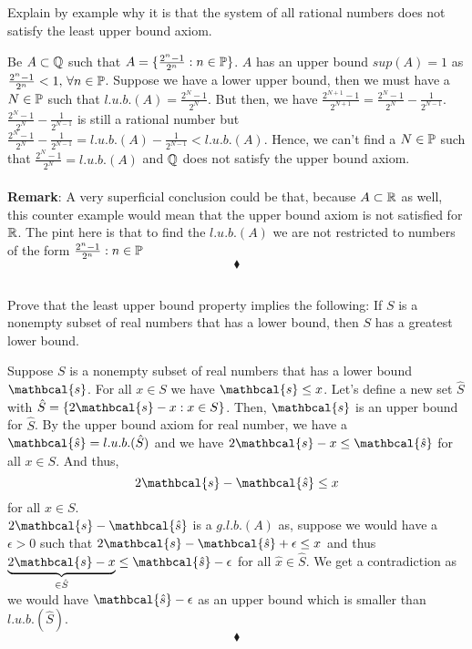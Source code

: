 \subsection{}
\begin{tcolorbox}
Explain by example why it is that the system of all rational numbers does not satisfy the least upper bound axiom.
\end{tcolorbox}
Be $A\subset\mathbb{Q}$ such that $A=\{\frac{2^n-1}{2^n}: n\in \mathbb{P}\}$. $A$ has an upper bound $sup(A)=1$ as $\frac{2^n-1}{2^n}<1,\,\forall n\in \mathbb{P}$. Suppose we have a lower upper bound, then we must have a $N\in \mathbb{P}$ such that $l.u.b.(A)= \frac{2^N-1}{2^N}$. But then, we have $\frac{2^{N+1}-1}{2^{N+1}}= \frac{2^N-1}{2^N}-\frac{1}{2^{N-1}}$. \\
$\frac{2^N-1}{2^N}-\frac{1}{2^{N-1}}$ is still a rational number but $\frac{2^N-1}{2^N}-\frac{1}{2^{N-1}}= l.u.b.(A)-\frac{1}{2^{N-1}}< l.u.b.(A)$. Hence, we can't find a $N\in\mathbb{P}$ such that $\frac{2^N-1}{2^N}=l.u.b.(A)$ and $\mathbb{Q}$ does not satisfy the upper bound axiom.\\\\
\textbf{Remark}: A very superficial conclusion could be that, because $A\subset \mathbb{R}$ as well, this counter example would mean that the upper bound axiom is not satisfied for $\mathbb{R}$. The pint here is that to find the $l.u.b.(A)$ we are not restricted to numbers of the form $\frac{2^n-1}{2^n}: n\in \mathbb{P}$  
$$\blacklozenge$$

\subsection{}
\begin{tcolorbox}
Prove that the least upper bound property implies the following: If $S$ is a nonempty subset of real numbers that has a lower bound, then $S$ has a greatest lower bound. 
\end{tcolorbox}
Suppose $S$ is a nonempty subset of real numbers that has a lower bound $\mathbcal{s}$. For all $x\in S$ we have $\mathbcal{s}\leq x$. Let's define a new set $\hat{S}$ with $\hat{S}=\{2\mathbcal{s}-x: x\in S\}$. Then, $\mathbcal{s}$ is an upper bound for $\hat{S}$. By the upper bound axiom for real number, we have a $\mathbcal{\hat{s}}= l.u.b.(\hat{S})$ and we have $2\mathbcal{s}-x\leq \mathbcal{\hat{s}}$ for all $x\in S$. And thus, $$2\mathbcal{s}- \mathbcal{\hat{s}}\leq x$$
for all $x\in S$.\\
$2\mathbcal{s}- \mathbcal{\hat{s}}$ is a $g.l.b.(A)$ as, suppose we would have a $\epsilon>0$ such that  $2\mathbcal{s}- \mathbcal{\hat{s}}+\epsilon \leq x$ and thus $\underbrace{2\mathbcal{s}-x}_{\in\hat{S}} \leq \mathbcal{\hat{s}}-\epsilon$ for all $\hat{x}\in \hat{S}$. We get a contradiction as we would have $\mathbcal{\hat{s}}-\epsilon$ as an upper bound which is smaller than $l.u.b.(\hat{S})$.
$$\blacklozenge$$


